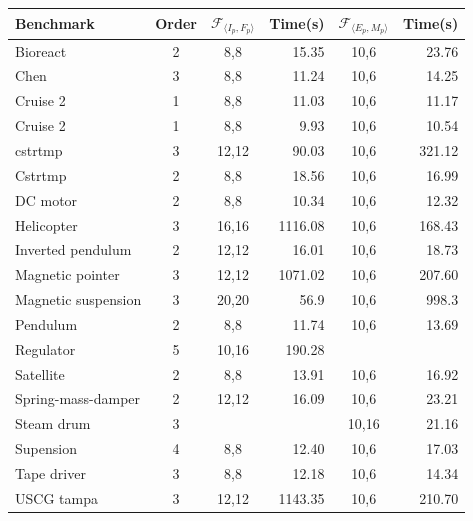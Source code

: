 \begin{table}
\centering
\begin{tabular}{| l | c | c | r | c | r |}
%
\hline
 Benchmark  &  Order  & $\mathcal{F}_{\langle I_p,F_p \rangle}$ & Time(s) & $\mathcal{F}_{\langle E_p, M_p \rangle}$ & Time(s) \\\hline
Bioreact	&	2	&	8,8	&	15.35	&	10,6	&	23.76	\\
Chen	&	3	&	8,8	&	11.24	&	10,6	&	14.25	\\
Cruise 2	&	1	&	8,8	&	11.03	&	10,6	&	11.17	\\
Cruise 2	&	1	&	8,8	&	9.93	&	10,6	&	10.54	\\
cstrtmp	&	3	&	12,12	&	90.03	&	10,6	&	321.12	\\
Cstrtmp	&	2	&	8,8	&	18.56	&	10,6	&	16.99	\\
DC motor	&	2	&	8,8	&	10.34	&	10,6	&	12.32	\\
Helicopter	&	3	&	16,16	&	1116.08	&	10,6	&	168.43	\\
Inverted pendulum	&	2	&	12,12	&	16.01	&	10,6	&	18.73	\\
Magnetic pointer	&	3	&	12,12	&	1071.02	&	10,6	&	207.60	\\
Magnetic suspension	&	3	&	20,20	&	56.9	&	10,6	&	998.3	\\
Pendulum	&	2	&	8,8	&	11.74	&	10,6	&	13.69	\\
Regulator	&	5	&	10,16	&	190.28	&		&	~\xmark	\\
Satellite	&	2	&	8,8	&	13.91	&	10,6	&	16.92	\\
Spring-mass-damper	&	2	&	12,12	&	16.09	&	10,6	&	23.21	\\
Steam drum	&	3	&		&	~\xmark	&	10,16	&	21.16	\\
Supension	&	4	&	8,8	&	12.40	&	10,6	&	17.03	\\
Tape driver	&	3	&	8,8	&	12.18	&	10,6	&	14.34	\\
USCG tampa	&	3	&	12,12	&	1143.35	&	10,6	&	210.70	\\
% 

\end{tabular}
\end{table}
